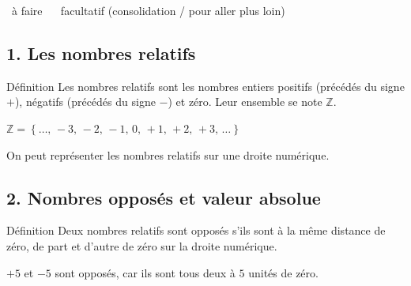  \vfill
\begin{center}
\small \case~à faire \qquad \oblig~ \qquad \faclt~facultatif (consolidation / pour aller plus loin)
\end{center}
\vspace{1em}

\newpage
{}

\subsection*{1. Les nombres relatifs}

\begin{regle}{Définition}
Les \textcolor{themeNO}{nombres relatifs} sont les nombres entiers positifs (précédés du signe $+$), négatifs (précédés du signe $-$) et zéro. Leur ensemble se note $\mathbb{Z}$.
\end{regle}

\vspace{10pt}
\begin{center}
$\mathbb{Z}=\left\{\ldots,\,-3,\,-2,\,-1,\,0,\,+1,\,+2,\,+3,\,\ldots\right\}$
\end{center}

\vspace{10pt}
On peut représenter les nombres relatifs sur une \textcolor{themeNO}{droite numérique}.

\vspace{20pt}
\begin{center}
\end{center}

\vfill
\subsection*{2. Nombres opposés et valeur absolue}

\begin{regle}{Définition}
Deux nombres relatifs sont \textcolor{themeNO}{opposés} s'ils sont à la même distance de zéro, de part et d'autre de zéro sur la droite numérique.
\end{regle}

\begin{center}
$+5$ et $-5$ sont opposés, car ils sont tous deux à $5$ unités de zéro.
\end{center}

